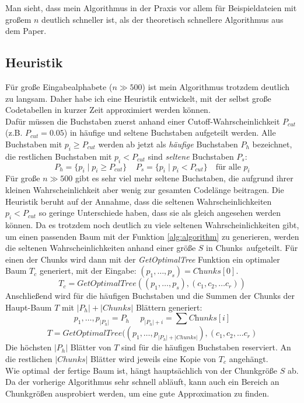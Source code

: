 \documentclass[a4paper,10pt,ngerman]{scrartcl}
\begin{document}
    Man sieht, dass mein Algorithmus in der Praxis vor allem für Beispieldateien mit großem $n$ deutlich schneller ist, als der theoretisch schnellere Algorithmus aus dem Paper.

    \subsection{Heuristik}
    Für große Eingabealphabete ($n \gg 500$) ist mein Algorithmus trotzdem deutlich zu langsam.
    Daher habe ich eine Heuristik entwickelt, mit der selbst große Codetabellen in kurzer Zeit approximiert werden können. \\
    Dafür müssen die Buchstaben zuerst anhand einer Cutoff-Wahrscheinlichkeit $P_{cut}$ (z.B. $P_{cut} = 0.05$) in häufige und seltene Buchstaben aufgeteilt werden.
    Alle Buchstaben mit $p_i \ge P_{cut}$ werden ab jetzt als \textit{häufige} Buchstaben $P_h$ bezeichnet, die restlichen Buchstaben mit $p_i < P_{cut}$ sind \textit{seltene} Buchstaben $P_s$:
    \[P_{h} = \{p_i \mid p_i \ge P_{cut}\}~~~~~P_s = \{p_i \mid p_i < P_{cut}\} \text{~~~für alle $p_i$}\]
    Für große $n \gg 500$ gibt es sehr viel mehr seltene Buchstaben, die aufgrund ihrer kleinen Wahrscheinlichkeit aber wenig zur gesamten Codelänge beitragen.
    Die Heuristik beruht auf der Annahme, dass die seltenen Wahrscheinlichkeiten $p_i < P_{cut}$ so geringe Unterschiede haben, dass sie als gleich angesehen werden können.
    Da es trotzdem noch deutlich zu viele seltenen Wahrscheinlichkeiten gibt, um einen passenden Baum mit der Funktion \ref{alg:algorithm} zu generieren, werden die seltenen Wahrscheinlichkeiten anhand einer größe $S$ in \glqq Chunks\grqq~aufgeteilt.
    Für einen der Chunks wird dann mit der \textit{GetOptimalTree} Funktion ein optimaler Baum $T_c$ generiert, mit der Eingabe: $(p_1, \dots, p_s) = \textit{Chunks}[0]$.
    \[T_c = \textit{GetOptimalTree}((p_1, \dots, p_s), (c_1, c_2, \dots c_r))\]
    Anschließend wird für die häufigen Buchstaben und die Summen der Chunks der Haupt-Baum $T$ mit $|P_h| + |Chunks|$ Blättern generiert:
    \[p_1, \dots, p_{|P_h|} = P_h~~~~~~p_{|P_h| + i} = \sum \textit{Chunks}[i]\]
    \[T = \textit{GetOptimalTree}((p_1, \dots, p_{|P_h| + |Chunks|}), (c_1, c_2, \dots c_r)\]
    Die höchsten $|P_h|$ Blätter von $T$ sind für die häufigen Buchstaben \glqq reserviert\grqq.
    An die restlichen $|Chunks|$ Blätter wird jeweils eine Kopie von $T_c$ angehängt. \\
    Wie \glqq optimal\grqq~der fertige Baum ist, hängt hauptsächlich von der Chunkgröße $S$ ab.
    Da der vorherige Algorithmus sehr schnell abläuft, kann auch ein Bereich an Chunkgrößen ausprobiert werden, um eine gute Approximation zu finden.
\end{document}
